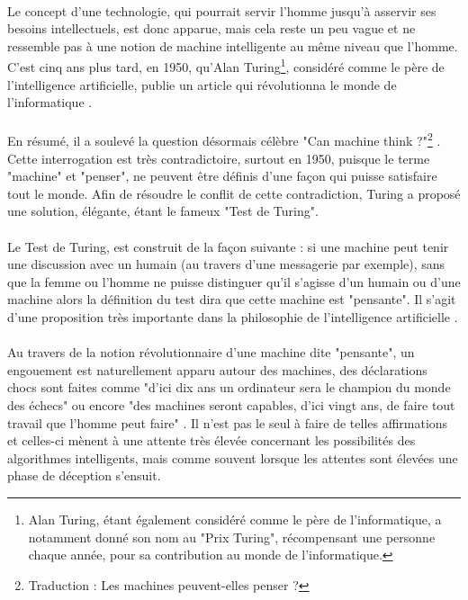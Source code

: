 \documentclass[10pt, french, a4paper]{article}
\begin{document}
\paragraph{}
Le concept d’une technologie, qui pourrait servir l’homme jusqu’à asservir ses besoins intellectuels, est donc apparue, mais cela reste un peu vague et ne ressemble pas à une notion de machine intelligente au même niveau que l’homme. C’est cinq ans plus tard, en 1950, qu’Alan Turing\footnote{Alan Turing, étant également considéré comme le père de l’informatique, a notamment donné son nom au "Prix Turing", récompensant une personne chaque année, pour sa contribution au monde de l’informatique.}, considéré comme le père de l’intelligence artificielle, publie un article qui révolutionna le monde de l’informatique \citep{turing_i.computing_1950}.

\paragraph{}
En résumé, il a soulevé la question désormais célèbre "Can machine think ?"\footnote{Traduction : Les machines peuvent-elles penser ?} . Cette interrogation est très contradictoire, surtout en 1950, puisque le terme "machine" et "penser", ne peuvent être définis d’une façon qui puisse satisfaire tout le monde. Afin de résoudre le conflit de cette contradiction, Turing a proposé une solution, élégante, étant le fameux "Test de Turing".

\paragraph{}
Le Test de Turing, est construit de la façon suivante : si une machine peut tenir une discussion avec un humain (au travers d’une messagerie par exemple), sans que la femme ou l’homme ne puisse distinguer qu’il s’agisse d’un humain ou d’une machine alors la définition du test dira que cette machine est "pensante". Il s’agit d’une proposition très importante dans la philosophie de l’intelligence artificielle \citep{pinar_saygin_turing_2000}.

\paragraph{}
Au travers de la notion révolutionnaire d'une machine dite "pensante", un engouement est naturellement apparu autour des machines, des déclarations chocs sont faites comme "d’ici dix ans un ordinateur sera le champion du monde des échecs" \citep{simon_heuristic_1958} ou encore "des machines seront capables, d’ici vingt ans, de faire tout travail que l’homme peut faire" \citep{simon_shape_1965}. Il n’est pas le seul à faire de telles affirmations et celles-ci mènent à une attente très élevée concernant les possibilités des algorithmes intelligents, mais comme souvent lorsque les attentes sont élevées une phase de déception s’ensuit.
\end{document}
